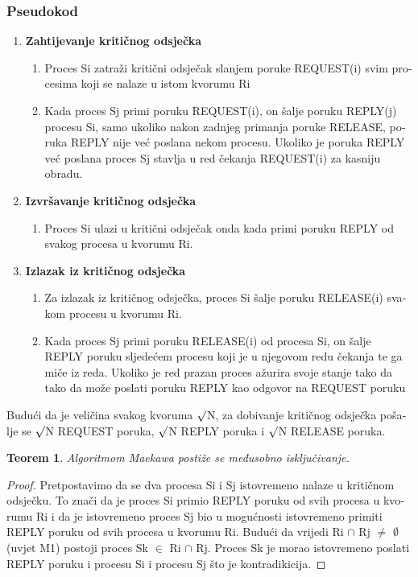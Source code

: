 \documentclass[12pt]{rectors}
\newtheorem{theorem}{Teorem}[section]
\begin{document}
\begin{otherlanguage}{croatian}
\subsubsection{Pseudokod}
\begin{enumerate}
	\item \textbf{Zahtijevanje kritičnog odsječka}
	\begin{enumerate}
		\item Proces Si zatraži kritični odsječak slanjem poruke REQUEST(i) svim procesima koji se nalaze u istom kvorumu Ri
		\item  Kada proces Sj primi poruku REQUEST(i), on šalje poruku REPLY(j) procesu Si, samo ukoliko nakon zadnjeg primanja poruke RELEASE, poruka REPLY nije već poslana nekom procesu. Ukoliko je poruka REPLY već poslana proces Sj stavlja u red čekanja REQUEST(i) za kasniju obradu.
	\end{enumerate}
	\item \textbf{Izvršavanje kritičnog odsječka}
	\begin{enumerate}
		\item  Proces Si ulazi u kritični odsječak onda kada primi poruku REPLY od svakog procesa u kvorumu Ri.
	\end{enumerate}
	\item \textbf{Izlazak iz kritičnog odsječka}
	\begin{enumerate}
		\item Za izlazak iz kritičnog odsječka, proces Si šalje poruku RELEASE(i) svakom procesu u kvorumu Ri. 
		\item Kada proces Sj primi poruku RELEASE(i) od procesa Si, on šalje REPLY poruku sljedećem procesu koji je u njegovom redu čekanja te ga miče iz reda. 
		Ukoliko je red prazan proces ažurira svoje stanje tako da tako da može poslati poruku REPLY kao odgovor na REQUEST poruku
	\end{enumerate}
\end{enumerate}


Budući da je veličina svakog kvoruma $\surd$N, za dobivanje kritičnog odsječka pošalje se $\surd$N REQUEST poruka, $\surd$N REPLY poruka i $\surd$N RELEASE poruka.


\begin{theorem}
	Algoritmom Maekawa postiže se međusobno isključivanje.
\end{theorem}

\begin{proof}
	Pretpostavimo da se dva procesa Si i Sj istovremeno nalaze u kritičnom odsječku. To znači da je proces Si primio REPLY poruku od svih procesa u kvorumu Ri i da je istovremeno proces Sj bio u mogućnosti istovremeno primiti REPLY poruku od svih procesa u kvorumu Ri. Budući da vrijedi Ri $\cap$ Rj $\neq$ $\emptyset$ (uvjet M1) postoji proces Sk $\in$ Ri $\cap$ Rj. Proces Sk je morao istovremeno poslati REPLY poruku i procesu Si i procesu Sj što je kontradikicija. 
\end{proof}



\end{otherlanguage}
\end{document}
